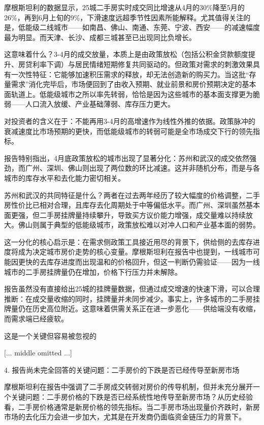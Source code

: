 \documentclass[11pt]{ctexart}
\begin{document}
摩根斯坦利的数据显示，25城二手房实时成交同比增速从4月的30\%降至5月的26\%，再到6月上旬的9\%，下滑速度远超季节性因素所能解释。尤其值得关注的是，低能级二线城市——如南昌、佛山、南通、东莞、宁波、西安——的减速幅度最为明显。而天津、长沙、成都三城甚至已出现同比负增长。

这意味着什么？3-4月的成交放量，本质上是由政策放松（包括公积金贷款额度提升、房贷利率下调）与居民情绪短期修复共同驱动的。但政策对需求的刺激效果具有一次性特征：它能够加速积压需求的释放，却无法创造新的购买力。当这批“存量需求”消化完毕后，市场便回到了由收入预期、就业前景和房价预期决定的基本面轨道上。低能级城市之所以率先转弱，恰恰是因为这些城市的基本面支撑更为脆弱——人口流入放缓、产业基础薄弱、库存压力更大。

对投资者的含义在于：不能再用3-4月的高增速作为线性外推的依据。政策脉冲的衰减速度比市场预期的更快，而低能级城市的转弱可能是全市场成交下行的领先指标。

报告特别指出，4月底政策放松的城市出现了显著分化：苏州和武汉的成交依然强劲，而广州、深圳、佛山则出现了两位数的环比减速。这并非随机分布，而是与各城市的库存水平和去化能力密切相关。

苏州和武汉的共同特征是什么？两者在过去两年经历了较大幅度的价格调整，二手房性价比已相对合理，且库存去化周期处于中等偏低水平。而广州、深圳虽然基本面更强，但二手房挂牌量持续攀升，导致买方议价能力增强，成交量难以持续放大。佛山则属于典型的低能级城市，政策放松难以对冲人口和产业基本面的弱势。

这一分化的核心启示是：在需求侧政策工具接近用尽的背景下，供给侧的去库存进度将成为决定城市房价走势的核心变量。摩根斯坦利在报告中也提到，一线城市可能因更快的去库存进度而出现温和的价格回升，但这一判断仍需验证——因为一线城市的二手房挂牌量仍在增加，价格下行压力并未解除。

报告虽然没有直接给出25城的挂牌量数据，但通过成交增速的快速下滑，可以合理推断：在成交量收缩的同时，挂牌量并未同步减少。事实上，许多城市的二手房挂牌量仍在历史高位附近。这意味着供需关系正在进一步恶化——供给端没有收缩，而需求端已经疲软。

这是一个关键但容易被忽视的

[... middle omitted ...]

4. 报告尚未完全回答的关键问题：二手房价的下跌是否已经传导至新房市场

摩根斯坦利在报告中强调了二手房成交转弱对房价的传导机制，但并未充分展开一个关键问题：二手房价格的下跌是否已经系统性地传导至新房市场？从历史经验看，二手房价格通常是新房价格的领先指标。当二手房市场出现量价齐跌时，新房市场的去化压力会进一步加大，尤其是在开发商仍面临资金链压力的背景下。
\end{document}
